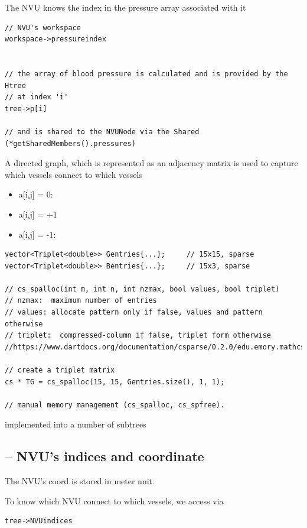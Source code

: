The NVU knows the index in the pressure array associated with it
\begin{verbatim}
// NVU's workspace
workspace->pressureindex


// the array of blood pressure is calculated and is provided by the Htree
// at index 'i'
tree->p[i]

// and is shared to the NVUNode via the Shared
(*getSharedMembers().pressures)
\end{verbatim}

A directed graph, which is represented as an adjacency
matrix is used to capture which vessels connect to which vessels
\begin{itemize}
  \item a[i,j] = 0:  
  
  \item a[i,j] = +1
  
  \item a[i,j] = -1: 
\end{itemize}


\begin{verbatim}
vector<Triplet<double>> Gentries{...};     // 15x15, sparse
vector<Triplet<double>> Bentries{...};     // 15x3, sparse

// cs_spalloc(int m, int n, int nzmax, bool values, bool triplet)
// nzmax:  maximum number of entries
// values: allocate pattern only if false, values and pattern otherwise
// triplet:  compressed-column if false, triplet form otherwise
//https://www.dartdocs.org/documentation/csparse/0.2.0/edu.emory.mathcs.csparse/cs_spalloc.html

// create a triplet matrix
cs * TG = cs_spalloc(15, 15, Gentries.size(), 1, 1);

// manual memory management (cs_spalloc, cs_spfree). 
\end{verbatim}

implemented into a number of subtrees



\subsection{-- NVU's indices and coordinate}

The NVU's coord is stored in meter unit.


To know which NVU connect to which vessels, we access via 
\begin{verbatim}
tree->NVUindices
\end{verbatim}


